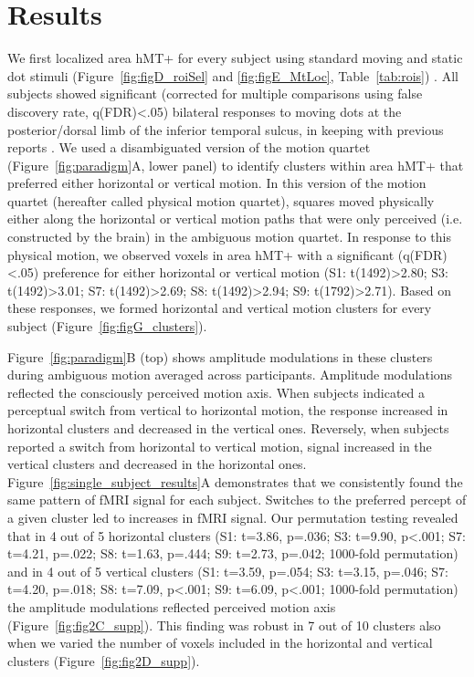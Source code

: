 \section{Results}
We first localized area hMT+ for every subject using standard moving and static dot stimuli (Figure~\ref{fig:figD_roiSel} and \ref{fig:figE_MtLoc}, Table~\ref{tab:rois}) \parencite{Huk2002,Emmerling2016}. All subjects showed significant (corrected for multiple comparisons using false discovery rate, q(FDR)\textless.05) bilateral responses to moving dots at the posterior/dorsal limb of the inferior temporal sulcus, in keeping with previous reports \parencite{Huk2002,Kolster2010}. We used a disambiguated version of the motion quartet (Figure~\ref{fig:paradigm}A, lower panel) to identify clusters within area hMT+ that preferred either horizontal or vertical motion. In this version of the motion quartet (hereafter called physical motion quartet), squares moved physically either along the horizontal or vertical motion paths that were only perceived (i.e. constructed by the brain) in the ambiguous motion quartet. In response to this physical motion, we observed voxels in area hMT+ with a significant (q(FDR) \textless .05) preference for either horizontal or vertical motion (S1: t(1492)\textgreater2.80; S3: t(1492)\textgreater3.01; S7: t(1492)\textgreater2.69; S8: t(1492)\textgreater2.94; S9: t(1792)\textgreater2.71). Based on these responses, we formed horizontal and vertical motion clusters for every subject (Figure~\ref{fig:figG_clusters}).

Figure~\ref{fig:paradigm}B (top) shows amplitude modulations in these clusters during ambiguous motion averaged across participants. Amplitude modulations reflected the consciously perceived motion axis. When subjects indicated a perceptual switch from vertical to horizontal motion, the response increased in horizontal clusters and decreased in the vertical ones. Reversely, when subjects reported a switch from horizontal to vertical motion, signal increased in the vertical clusters and decreased in the horizontal ones. Figure~\ref{fig:single_subject_results}A demonstrates that we consistently found the same pattern of fMRI signal for each subject. Switches to the preferred percept of a given cluster led to increases in fMRI signal. Our permutation testing revealed that in 4 out of 5 horizontal clusters (S1: t=3.86, p=.036; S3: t=9.90, p\textless.001; S7: t=4.21, p=.022; S8: t=1.63, p=.444; S9: t=2.73, p=.042; 1000-fold permutation) and in 4 out of 5 vertical clusters (S1: t=3.59, p=.054; S3: t=3.15, p=.046; S7: t=4.20, p=.018; S8: t=7.09, p\textless.001; S9: t=6.09, p\textless.001; 1000-fold permutation) the amplitude modulations reflected perceived motion axis (Figure~\ref{fig:fig2C_supp}). This finding was robust in 7 out of 10 clusters also when we varied the number of voxels included in the horizontal and vertical clusters (Figure~\ref{fig:fig2D_supp}).

